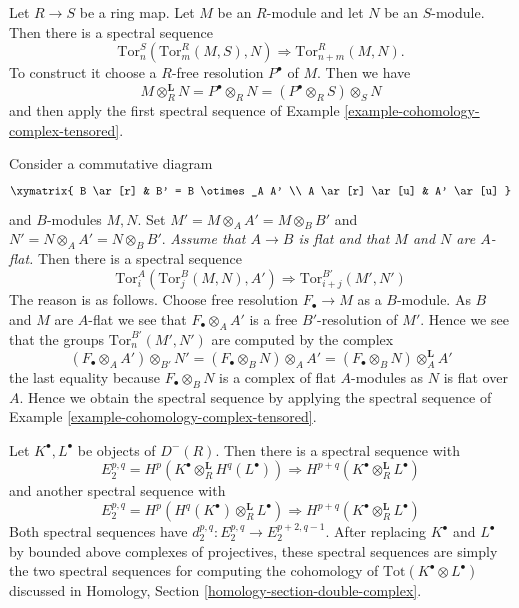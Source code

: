 \begin{example}
\label{example-tor-change-rings}
Let $R \to S$ be a ring map. Let $M$ be an $R$-module and let
$N$ be an $S$-module. Then there is a spectral sequence
$$
\text{Tor}^S_n(\text{Tor}^R_m(M, S), N) \Rightarrow
\text{Tor}^R_{n + m}(M, N).
$$
To construct it choose a $R$-free resolution $P^\bullet$ of $M$. Then we have
$$
M \otimes_R^{\mathbf{L}} N = P^\bullet \otimes_R N =
(P^\bullet \otimes_R S) \otimes_S N
$$
and then apply the first spectral sequence of
Example \ref{example-cohomology-complex-tensored}.
\end{example}

\begin{example}
\label{example-tor-base-change}
Consider a commutative diagram
$$
\xymatrix{
B \ar[r] & B' = B \otimes_A A' \\
A \ar[r] \ar[u] & A' \ar[u]
}
$$
and $B$-modules $M, N$. Set $M' = M \otimes_A A' = M \otimes_B B'$
and $N' = N \otimes_A A' = N \otimes_B B'$.
{\it Assume that $A \to B$ is flat and that $M$ and $N$ are $A$-flat.}
Then there is a spectral sequence
$$
\text{Tor}^A_i(\text{Tor}_j^B(M, N), A')
\Rightarrow
\text{Tor}^{B'}_{i + j}(M', N')
$$
The reason is as follows. Choose free resolution
$F_\bullet \to M$ as a $B$-module. As $B$ and $M$ are $A$-flat we see
that $F_\bullet \otimes_A A'$ is a free $B'$-resolution of $M'$.
Hence we see that the groups $\text{Tor}^{B'}_n(M', N')$ are
computed by the complex
$$
(F_\bullet \otimes_A A') \otimes_{B'} N' =
(F_\bullet \otimes_B N) \otimes_A A' =
(F_\bullet \otimes_B N) \otimes^{\mathbf{L}}_A A'
$$
the last equality because $F_\bullet \otimes_B N$ is a complex
of flat $A$-modules as $N$ is flat over $A$. Hence we obtain the
spectral sequence by applying the spectral sequence of
Example \ref{example-cohomology-complex-tensored}.
\end{example}

\begin{example}
\label{example-tor}
Let $K^\bullet, L^\bullet$ be objects of $D^{-}(R)$.
Then there is a spectral sequence with
$$
E_2^{p, q} = H^p(K^\bullet \otimes_R^{\mathbf{L}} H^q(L^\bullet))
\Rightarrow H^{p + q}(K^\bullet \otimes_R^{\mathbf{L}} L^\bullet)
$$
and another spectral sequence with
$$
E_2^{p, q} =
H^p(H^q(K^\bullet) \otimes_R^{\mathbf{L}} L^\bullet)
\Rightarrow H^{p + q}(K^\bullet \otimes_R^{\mathbf{L}} L^\bullet)
$$
Both spectral sequences have $d_2^{p, q} : E_2^{p, q} \to E_2^{p + 2, q - 1}$.
After replacing $K^\bullet$ and $L^\bullet$ by bounded above complexes
of projectives, these spectral sequences are simply the two spectral
sequences for computing the cohomology of
$\text{Tot}(K^\bullet \otimes L^\bullet)$ discussed in
Homology, Section \ref{homology-section-double-complex}.
\end{example}









